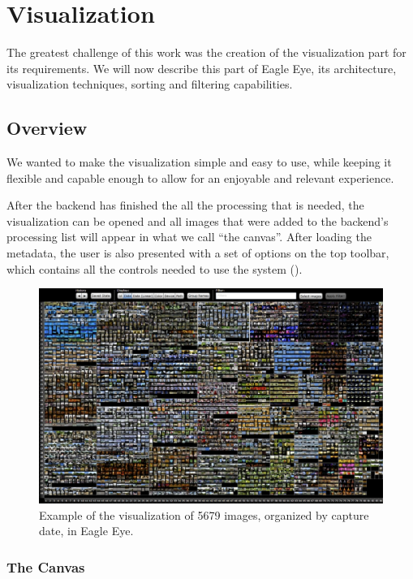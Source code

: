 \section{Visualization} %
\label{sub:visualization}

The greatest challenge of this work was the creation of the visualization part for its requirements. We will now describe this part of Eagle Eye, its architecture, visualization techniques, sorting and filtering capabilities.

\subsection{Overview}
We wanted to make the visualization simple and easy to use, while keeping it flexible and capable enough to allow for an enjoyable and relevant experience.

After the backend has finished the all the processing that is needed, the visualization can be opened and all images that were added to the backend's processing list will appear in what we call ``the canvas''. After loading the metadata, the user is also presented with a set of options on the top toolbar, which contains all the controls needed to use the system ().


\begin{figure}[ht]
	\centering
		\includegraphics[width=\columnwidth]{Figures/viz5679images1280.pdf}
	\caption{Example of the visualization of 5679 images, organized by capture date, in Eagle Eye.}
	\label{fig:viz5679images}
\end{figure}



\subsubsection{The Canvas}

